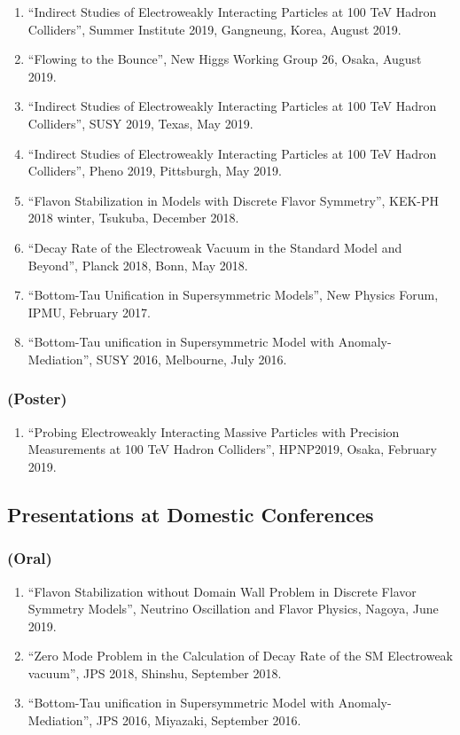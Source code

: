 \documentclass[12pt]{article}
\begin{document}
\begin{enumerate}
 \item ``Indirect Studies of Electroweakly Interacting Particles at 100 TeV Hadron Colliders'', Summer Institute 2019, Gangneung, Korea, August 2019.
 \item ``Flowing to the Bounce'', New Higgs Working Group 26, Osaka, August 2019.
 \item ``Indirect Studies of Electroweakly Interacting Particles at 100 TeV Hadron Colliders'', SUSY 2019, Texas, May 2019.
 \item ``Indirect Studies of Electroweakly Interacting Particles at 100 TeV Hadron Colliders'', Pheno 2019, Pittsburgh, May 2019.
 \item ``Flavon Stabilization in Models with Discrete Flavor Symmetry'', KEK-PH 2018 winter, Tsukuba, December 2018.
 \item ``Decay Rate of the Electroweak Vacuum in the Standard Model and Beyond'', Planck 2018, Bonn, May 2018.
 \item ``Bottom-Tau Unification in Supersymmetric Models'', New Physics Forum, IPMU, February 2017.
 \item ``Bottom-Tau unification in Supersymmetric Model with Anomaly-Mediation'', SUSY 2016, Melbourne, July 2016.
\end{enumerate}

\subsubsection*{(Poster)}

\begin{enumerate}
  \item ``Probing Electroweakly Interacting Massive Particles with Precision Measurements at 100 TeV Hadron Colliders'', HPNP2019, Osaka, February 2019.
\end{enumerate}

\subsection*{Presentations at Domestic Conferences}

\subsubsection*{(Oral)}

\begin{enumerate}
  \item ``Flavon Stabilization without Domain Wall Problem in Discrete Flavor Symmetry Models'', Neutrino Oscillation and Flavor Physics, Nagoya, June 2019.
  \item ``Zero Mode Problem in the Calculation of Decay Rate of the SM Electroweak vacuum'', JPS 2018, Shinshu, September 2018.
  \item ``Bottom-Tau unification in Supersymmetric Model with Anomaly-Mediation'', JPS 2016, Miyazaki, September 2016.
\end{enumerate}
\end{document}

